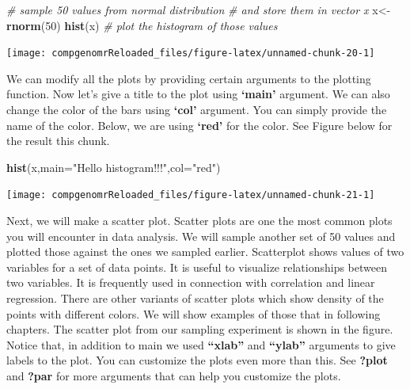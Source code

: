 \documentclass[12pt,]{krantz}
\newenvironment{Shaded}{\begin{snugshade}}{\end{snugshade}}
\newcommand{\CommentTok}[1]{\textcolor[rgb]{0.56,0.35,0.01}{\textit{#1}}}
\newcommand{\DataTypeTok}[1]{\textcolor[rgb]{0.13,0.29,0.53}{#1}}
\newcommand{\DecValTok}[1]{\textcolor[rgb]{0.00,0.00,0.81}{#1}}
\newcommand{\KeywordTok}[1]{\textcolor[rgb]{0.13,0.29,0.53}{\textbf{#1}}}
\newcommand{\NormalTok}[1]{#1}
\newcommand{\StringTok}[1]{\textcolor[rgb]{0.31,0.60,0.02}{#1}}
\begin{document}
\begin{Shaded}
\begin{Highlighting}[]
\CommentTok{# sample 50 values from normal distribution}
\CommentTok{# and store them in vector x}
\NormalTok{x<-}\KeywordTok{rnorm}\NormalTok{(}\DecValTok{50}\NormalTok{)}
\KeywordTok{hist}\NormalTok{(x) }\CommentTok{# plot the histogram of those values}
\end{Highlighting}
\end{Shaded}

\begin{center}\texttt{[image: compgenomrReloaded\_files/figure-latex/unnamed-chunk-20-1]} \end{center}

We can modify all the plots by providing certain arguments to the plotting function. Now let's give a title to the plot using \textbf{`main'} argument. We can also change the color of the bars using \textbf{`col'} argument. You can simply provide the name of the color. Below, we are using \textbf{`red'} for the color. See Figure below for the result this chunk.

\begin{Shaded}
\begin{Highlighting}[]
\KeywordTok{hist}\NormalTok{(x,}\DataTypeTok{main=}\StringTok{"Hello histogram!!!"}\NormalTok{,}\DataTypeTok{col=}\StringTok{"red"}\NormalTok{)}
\end{Highlighting}
\end{Shaded}

\begin{center}\texttt{[image: compgenomrReloaded\_files/figure-latex/unnamed-chunk-21-1]} \end{center}

Next, we will make a scatter plot. Scatter plots are one the most common plots you will encounter in data analysis. We will sample another set of 50 values and plotted those against the ones we sampled earlier. Scatterplot shows values of two variables for a set of data points. It is useful to visualize relationships between two variables. It is frequently used in connection with correlation and linear regression. There are other variants of scatter plots which show density of the points with different colors. We will show examples of those that in following chapters. The scatter plot from our sampling experiment is shown in the figure. Notice that, in addition to main we used \textbf{``xlab''} and \textbf{``ylab''} arguments to give labels to the plot. You can customize the plots even more than this. See \textbf{?plot} and \textbf{?par} for more arguments that can help you customize the plots.
\end{document}
